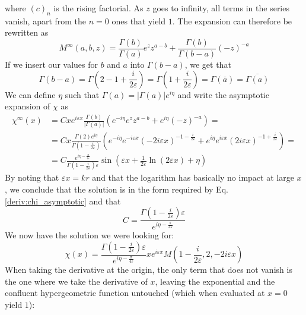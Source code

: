 where \((c)_n\) is the rising factorial. As \(z\) goes to infinity, all terms in the series vanish, apart from the \(n=0\) ones that yield \(1\). The expansion can therefore be rewritten as
\begin{equation}\label{deriv:Mexpansion}
	M^{\infty} (a,b,z) =
	\frac{\Gamma (b)}{\Gamma (a)} e^z z^{a-b} +
	\frac{\Gamma (b)}{\Gamma (b-a)}(-z)^{-a}
\end{equation}
If we insert our values for \(b\) and \(a\) into \(\Gamma (b-a)\), we get that
\begin{equation}
	\Gamma (b-a) = \Gamma \left( 2- 1 + \frac{i}{2\varepsilon } \right) = \Gamma \left( 1+ \frac{i}{2 \varepsilon } \right) = \Gamma (\overline{a})= \overline{\Gamma (a)}
\end{equation}
We can define \(\eta \) such that \(\Gamma (a) = \vert \Gamma (a) \vert e^{i \eta } \) and write the asymptotic expansion of \(\chi \) as
\begin{align}
	\chi^{\infty}(x) &= Cxe^{i\varepsilon x} \frac{\Gamma (b)}{\vert \Gamma (a) \vert }
	\left( e^{-i \eta } e^z	z^{a-b} + e^{i \eta } (-z)^{-a}  \right) =\\
	&= C x \frac{\Gamma (2) e^{i \eta }}{\Gamma \left(1-\frac{i}{2\varepsilon }\right)}\left( e^{-i \eta } e^{-i\varepsilon x}(-2i\varepsilon x)^{-1-\frac{i}{2\varepsilon }} + e^{i \eta } e^{i \varepsilon x} (2i \varepsilon x)^{-1+ \frac{i}{2\varepsilon }} \right)=\\
	&=C \frac{e^{i \eta - \frac{\pi}{4 \varepsilon }}}{\Gamma \left( 1-\frac{i}{2\varepsilon } \right) \varepsilon } \sin \left( \varepsilon x + \frac{1}{2\varepsilon} \ln (2\varepsilon x) + \eta \right)
\end{align}
By noting that \(\varepsilon x= kr\) and that the logarithm has basically no impact at large \(x\), we conclude that the solution is in the form required by Eq. \eqref{deriv:chi_asymptotic} and that
\begin{equation}
	C = \frac{\Gamma \left( 1- \frac{i}{2\varepsilon }\right) \varepsilon }{e^{i \eta - \frac{\pi}{4 \varepsilon }}}
\end{equation}
We now have the solution we were looking for:
\begin{equation}\label{deriv:solution}
	\chi (x) = \frac{\Gamma \left(1-\frac{i}{2\varepsilon }\right) \varepsilon }{e^{i \eta - \frac{\pi}{4 \varepsilon }}}x e^{i\varepsilon x}M\left(1-\frac{i}{2\varepsilon },2,-2i \varepsilon x\right) 
\end{equation}
When taking the derivative at the origin, the only term that does not vanish is the one where we take the derivative of \(x \), leaving the exponential and the confluent hypergeometric function untouched (which when evaluated at \(x=0\) yield \(1\)):
